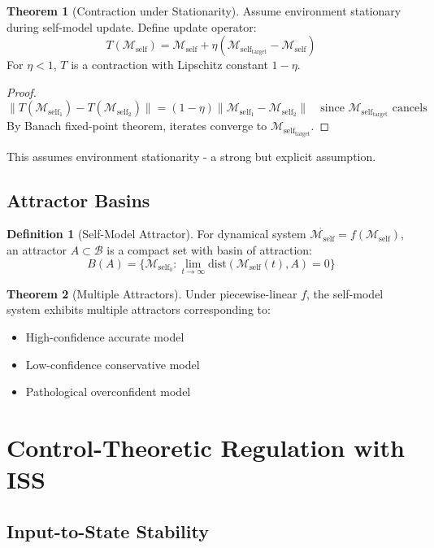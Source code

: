 \documentclass[12pt]{article}
\theoremstyle{definition}
\newtheorem{definition}{Definition}[section]
\newtheorem{theorem}{Theorem}[section]
\newcommand{\self}{\mathcal{M}_{\text{self}}}
\begin{document}
\begin{theorem}[Contraction under Stationarity]
Assume environment stationary during self-model update. Define update operator:
\[
T(\self) = \self + \eta(\self_{\text{target}} - \self)
\]
For $\eta < 1$, $T$ is a contraction with Lipschitz constant $1-\eta$.
\end{theorem}

\begin{proof}
\[
\|T(\self_1) - T(\self_2)\| = (1-\eta)\|\self_1 - \self_2\| \quad \text{since } \self_{\text{target}} \text{ cancels}
\]
By Banach fixed-point theorem, iterates converge to $\self_{\text{target}}$.
\end{proof}

\begin{remark}
This assumes environment stationarity - a strong but explicit assumption.
\end{remark}

\subsection{Attractor Basins}

\begin{definition}[Self-Model Attractor]
For dynamical system $\dot{\self} = f(\self)$, an attractor $A \subset \mathcal{B}$ is a compact set with basin of attraction:
\[
B(A) = \{\self_0: \lim_{t\to\infty} \text{dist}(\self(t), A) = 0\}
\]
\end{definition}

\begin{theorem}[Multiple Attractors]
Under piecewise-linear $f$, the self-model system exhibits multiple attractors corresponding to:
\begin{itemize}
    \item High-confidence accurate model
    \item Low-confidence conservative model
    \item Pathological overconfident model
\end{itemize}
\end{theorem}

\section{Control-Theoretic Regulation with ISS}

\subsection{Input-to-State Stability}
\end{document}
